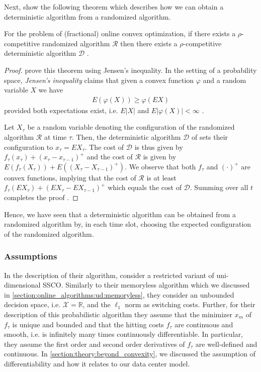 Next, \citeauthor*{Bansal2015} show the following theorem which describes how we can obtain a deterministic algorithm from a randomized algorithm. \begin{theorem}
    For the problem of (fractional) online convex optimization, if there exists a $\rho$-competitive randomized algorithm $\mathcal{R}$ then there exists a $\rho$-competitive deterministic algorithm $\mathcal{D}$ \cite{Bansal2015}.
\end{theorem}
\begin{proof}
\citeauthor*{Bansal2015} prove this theorem using Jensen's inequality. In the setting of a probability space, \textit{Jensen's inequality} claims that given a convex function $\varphi$ and a random variable $X$ we have \begin{align}
    E(\varphi(X)) \geq \varphi(E X)
\end{align} provided both expectations exist, i.e. $E |X|$ and $E |\varphi(X)| < \infty$ \cite{Durrett2010}.

Let $X_{\tau}$ be a random variable denoting the configuration of the randomized algorithm $\mathcal{R}$ at time $\tau$. Then, the deterministic algorithm $\mathcal{D}$ of \citeauthor*{Bansal2015} sets their configuration to $x_{\tau} = E X_{\tau}$. The cost of $\mathcal{D}$ is thus given by $f_{\tau}(x_{\tau}) + (x_{\tau} - x_{\tau-1})^+$ and the cost of $\mathcal{R}$ is given by $E(f_{\tau}(X_{\tau})) + E((X_{\tau} - X_{\tau-1})^+)$. We observe that both $f_{\tau}$ and $(\cdot)^+$ are convex functions, implying that the cost of $\mathcal{R}$ is at least $f_{\tau}(E X_{\tau}) + (E X_{\tau} - E X_{\tau-1})^+$ which equals the cost of $\mathcal{D}$. Summing over all $t$ completes the proof \cite{Bansal2015}.
\end{proof}

Hence, we have seen that a deterministic algorithm can be obtained from a randomized algorithm by, in each time slot, choosing the expected configuration of the randomized algorithm.

\subsubsection{Assumptions}

In the description of their algorithm, \citeauthor*{Bansal2015} consider a restricted variant of uni-dimensional SSCO. Similarly to their memoryless algorithm which we discussed in \autoref{section:online_algorithms:ud:memoryless}, they consider an unbounded decision space, i.e. $\mathcal{X} = \mathbb{R}$, and the $\ell_1$ norm as switching costs. Further, for their description of this probabilistic algorithm they assume that the minimizer $x_m$ of $f_{\tau}$ is unique and bounded and that the hitting costs $f_{\tau}$ are continuous and smooth, i.e. is infinitely many times continuously differentiable. In particular, they assume the first order and second order derivatives of $f_{\tau}$ are well-defined and continuous. In \autoref{section:theory:beyond_convexity}, we discussed the assumption of differentiability and how it relates to our data center model.


